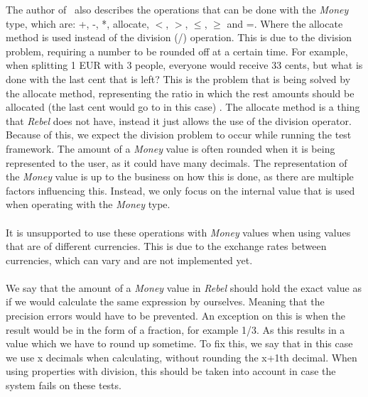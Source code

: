 The author of~\cite{fowler2002patterns} also describes the operations that can
be done with the \textit{Money} type, which are: +, -, *, allocate, $<$, $>$,
$\leq$, $\geq$ and =. Where the allocate method is used instead of the division (/) operation. This is due to the division problem, requiring a number to be rounded off at a certain time. For example, when splitting 1 EUR with 3 people, everyone would receive 33 cents, but what is done with the last cent that is left? This is the problem that is being solved by the allocate method, representing the ratio in which the rest amounts should be allocated (the last cent would go to in this case) \cite{fowler2002patterns}. The allocate method is a thing that \textit{Rebel} does not have, instead it just allows the use of the division operator. Because of this, we expect the division problem to occur while running the test framework. The amount of a \textit{Money} value is often rounded when it is being represented to the user, as it could have many decimals. The representation of the \textit{Money} value is up to the business on how this is done, as there are multiple factors influencing this. Instead, we only focus on the internal value that is used when operating with the \textit{Money} type.\\
\\
It is unsupported to use these operations with \textit{Money} values when using
values that are of different currencies. This is due to the exchange rates
between currencies, which can vary and are not implemented yet.\\
\\
We say that the amount of a \textit{Money} value in \textit{Rebel} should hold the exact value as if we would calculate the same expression by ourselves. Meaning that the precision errors would have to be prevented. An exception on this is when the result would be in the form of a fraction, for example 1/3. As this results in a value which we have to round up sometime. To fix this, we say that in this case we use x decimals when calculating, without rounding the x+1th decimal. When using properties with division, this should be taken into account in case the system fails on these tests. 

